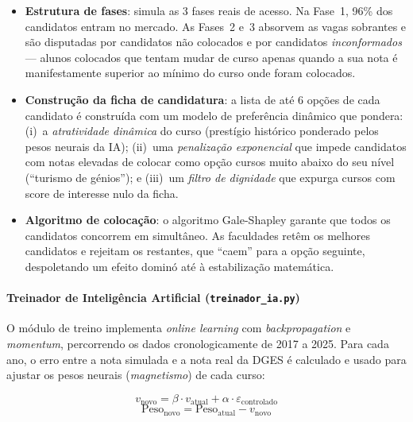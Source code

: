 \documentclass[12pt,a4paper]{article}
\begin{document}
\begin{itemize}
  \item \textbf{Estrutura de fases}: simula as 3 fases reais de acesso. Na Fase~1, 96\% dos candidatos entram no mercado. As Fases~2 e~3 absorvem as vagas sobrantes e são disputadas por candidatos não colocados e por candidatos \textit{inconformados} --- alunos colocados que tentam mudar de curso apenas quando a sua nota é manifestamente superior ao mínimo do curso onde foram colocados.

  \item \textbf{Construção da ficha de candidatura}: a lista de até 6 opções de cada candidato é construída com um modelo de preferência dinâmico que pondera: (i)~a \textit{atratividade dinâmica} do curso (prestígio histórico ponderado pelos pesos neurais da IA); (ii)~uma \textit{penalização exponencial} que impede candidatos com notas elevadas de colocar como opção cursos muito abaixo do seu nível (``turismo de génios''); e (iii)~um \textit{filtro de dignidade} que expurga cursos com score de interesse nulo da ficha.

  \item \textbf{Algoritmo de colocação}: o algoritmo Gale-Shapley garante que todos os candidatos concorrem em simultâneo. As faculdades retêm os melhores candidatos e rejeitam os restantes, que ``caem'' para a opção seguinte, despoletando um efeito dominó até à estabilização matemática.
\end{itemize}

\paragraph{Treinador de Inteligência Artificial (\texttt{treinador\_ia.py})}

O módulo de treino implementa \textit{online learning} com \textit{backpropagation} e \textit{momentum}, percorrendo os dados cronologicamente de 2017 a 2025. Para cada ano, o erro entre a nota simulada e a nota real da DGES é calculado e usado para ajustar os pesos neurais (\textit{magnetismo}) de cada curso:

\begin{equation}
v_{\text{novo}} = \beta \cdot v_{\text{atual}} + \alpha \cdot \varepsilon_{\text{controlado}}
\label{eq:momentum}
\end{equation}
\begin{equation}
\text{Peso}_{\text{novo}} = \text{Peso}_{\text{atual}} - v_{\text{novo}}
\label{eq:update}
\end{equation}
\end{document}
